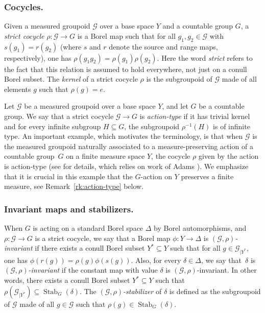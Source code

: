 \documentclass[11pt]{article}
\numberwithin{equation}{section}
\let\mathcal\mathscr
\theoremstyle{plain}
\theoremstyle{definition}
\newcommand{\calg}{\mathcal{G}}
\newcommand{\Stab}{\operatorname{Stab}}
\begin{document}
\subsubsection*{Cocycles.} Given a measured groupoid $\calg$ over a base space $Y$ and a countable group $G$, a \emph{strict cocycle} $\rho:\calg\to G$ is a Borel map such that for all $g_1,g_2\in\calg$ with $s(g_1)=r(g_2)$ (where $s$ and $r$ denote the source and range maps, respectively), one has $\rho(g_1g_2)=\rho(g_1)\rho(g_2)$. Here the word \emph{strict} refers to the fact that this relation is assumed to hold everywhere, not just on a conull Borel subset. The \emph{kernel} of a strict cocycle $\rho$ is the subgroupoid of $\calg$ made of all elements $g$ such that $\rho(g)=e$.

Let $\calg$ be a measured groupoid over a base space $Y$, and let $G$ be a countable group. We say that a strict cocycle $\calg\to G$ is \emph{action-type} if it has trivial kernel and for every infinite subgroup $H\subseteq G$, the subgroupoid $\rho^{-1}(H)$ is of infinite type. An important example, which motivates the terminology, is that when $\calg$ is the measured groupoid naturally associated to a measure-preserving action of a countable group~$G$ on a finite measure space $Y$, the cocycle $\rho$ given by the action is action-type (see \cite[Prop.\,2.26]{Kid-survey} for details, which relies on work of Adams \cite{Ada}). We emphasize that it is crucial in this example that the $G$-action on $Y$ preserves a finite measure, see Remark~\ref{rk:action-type} below.

\subsubsection*{Invariant maps and stabilizers.} When $G$ is acting on a standard Borel space $\Delta$ by Borel automorphisms, and $\rho:\calg\to G$ is a strict cocycle, we say that a Borel map $\phi:Y\to\Delta$ is \emph{$(\calg,\rho)$-invariant} if there exists a conull Borel subset $Y^*\subseteq Y$ such that for all $g\in\calg_{|Y^*}$, one has $\phi(r(g))=\rho(g)\phi(s(g))$.
Also, for every $\delta\in\Delta$, we say that~$\delta$ is \emph{$(\calg,\rho)$-invariant} if the constant map with value $\delta$ is $(\calg,\rho)$-invariant. In other words, there exists a conull Borel subset $Y^*\subseteq Y$ such that $\rho(\calg_{|Y^*})\subseteq \Stab_G(\delta)$. The \emph{$(\calg,\rho)$-stabilizer} of $\delta$ is defined as the subgroupoid of $\calg$ made of all $g\in\calg$ such that $\rho(g)\in\Stab_G(\delta)$.
\end{document}
